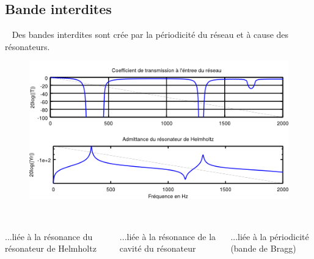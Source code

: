 \documentclass[12pt,notes=show]{beamer} %
\begin{document}
\subsection{Bande interdites}
\begin{frame}{~}
	\vspace{0.5cm}
Des bandes interdites sont crée par la périodicité du réseau et à cause des résonateurs.	
	\begin{figure}
		\includegraphics[scale=0.45]{transmission.png}
	\end{figure}
	\vspace{-1cm}
	
	\begin{columns}
		
		\flushright
		\\ \centering
 		...liée à la résonance du résonateur de Helmholtz
		
		\flushright
		\\ \centering
 		...liée à la résonance de la cavité du résonateur
 		
 		\centering
 		\\
 		...liée à la périodicité (bande de Bragg)
		
	\end{columns}
\end{frame}
\end{document}
